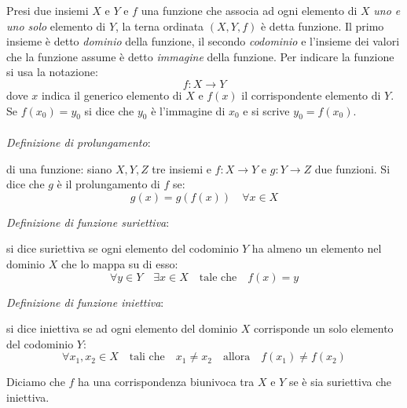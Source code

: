     Presi due insiemi $X$ e $Y$ e $f$ una funzione che associa ad ogni elemento 
    di $X$ \emph{uno e uno solo} elemento di $Y$, la terna ordinata $(X,Y,f)$ è detta funzione.
    Il primo insieme è detto \emph{dominio} della funzione, il secondo \emph{codominio} e 
    l'insieme dei valori che la funzione assume è detto \emph{immagine} della funzione. Per indicare la funzione si usa la notazione:
        \begin{equation}
            f: X \to Y
        \end{equation}
        dove $x$ indica il generico elemento di $X$ e $f(x)$ il corrispondente elemento di $Y$.
        Se $f(x_0)=y_0$ si dice che $y_0$ è l'immagine di $x_0$ e si scrive $y_0=f(x_0)$. 
        \\\\ \emph{Definizione di prolungamento}: 
        \begin{definizione} di una funzione: siano $X,Y,Z$ tre insiemi e $f: X \to Y$ e $g: Y \to Z$ due funzioni. Si dice che $g$ è il prolungamento di $f$ se:
        \begin{equation}
            g(x)=g(f(x)) \quad \forall x \in X
        \end{equation}
    \end{definizione}
    \vspace{0.1cm} %
    \emph{Definizione di funzione suriettiva}: 
    \begin{definizione} 
        si dice suriettiva se ogni elemento del codominio $Y$ ha almeno un elemento nel dominio $X$ che lo mappa su di esso:
        \begin{equation}
            \forall y \in Y \quad \exists x \in X \quad \text{tale che} \quad f(x)=y
        \end{equation}  
    \end{definizione}
    \emph{Definizione di funzione iniettiva}: 
    \begin{definizione} si dice iniettiva se ad ogni elemento del dominio $X$ corrisponde un solo elemento del codominio $Y$:
        \begin{equation}
            \forall x_1,x_2 \in X \quad \text{tali che} \quad x_1 \neq x_2 \quad \text{allora} \quad f(x_1) \neq f(x_2)
        \end{equation}
    \end{definizione}
\begin{definizione}
    Diciamo che $f$ ha una corrispondenza biunivoca tra $X$ e $Y$ se è sia suriettiva che iniettiva.
\end{definizione}

